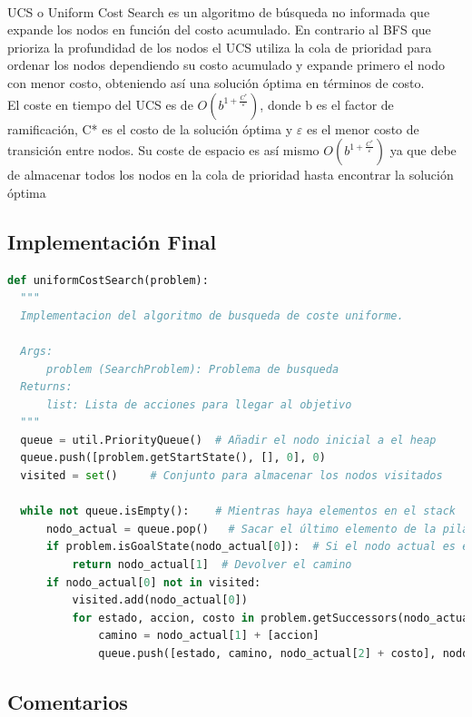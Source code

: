 \documentclass{report}
\begin{document}
          \paragraph*{}{
            UCS o Uniform Cost Search es un algoritmo de búsqueda no informada que expande los nodos en función del costo acumulado. En contrario al BFS que prioriza la profundidad de los nodos el UCS utiliza la cola de prioridad para ordenar los nodos dependiendo su costo acumulado y expande primero el nodo con menor costo, obteniendo así una solución óptima en términos de costo.\\  
            El coste en tiempo del UCS es de \( O(b^{1 +\frac{ C^*}{\varepsilon}}) \), donde b es el factor de ramificación, C* es el costo de la solución óptima y \( \varepsilon \)  es el menor costo de transición entre nodos. Su coste de espacio es así mismo \( O(b^{1 +\frac{ C^*}{\varepsilon}}) \) ya que debe de almacenar todos los nodos en la cola de prioridad hasta encontrar la solución óptima \\
          }
        \subsection*{Implementación Final}
          \begin{lstlisting}[language=Python, caption=Implementación final del UCS]
def uniformCostSearch(problem):
  """
  Implementacion del algoritmo de busqueda de coste uniforme.

  Args:
      problem (SearchProblem): Problema de busqueda
  Returns:
      list: Lista de acciones para llegar al objetivo
  """
  queue = util.PriorityQueue()  # Añadir el nodo inicial a el heap
  queue.push([problem.getStartState(), [], 0], 0)
  visited = set()     # Conjunto para almacenar los nodos visitados

  while not queue.isEmpty():    # Mientras haya elementos en el stack
      nodo_actual = queue.pop()   # Sacar el último elemento de la pila
      if problem.isGoalState(nodo_actual[0]):  # Si el nodo actual es el objetivo
          return nodo_actual[1]  # Devolver el camino
      if nodo_actual[0] not in visited:
          visited.add(nodo_actual[0])
          for estado, accion, costo in problem.getSuccessors(nodo_actual[0]): # Añadir los hijos del nodo actual a la pila
              camino = nodo_actual[1] + [accion]
              queue.push([estado, camino, nodo_actual[2] + costo], nodo_actual[2] + costo)
          \end{lstlisting}
        \subsection*{Comentarios}
\end{document}
